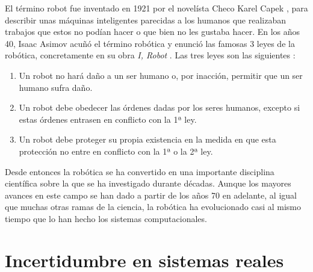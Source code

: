 El término robot fue inventado en 1921 por el novelísta Checo Karel Capek \cite{capek_r.u.r._2004}, para describir unas máquinas inteligentes parecidas a los humanos que realizaban trabajos que estos no podían hacer o que bien no les gustaba hacer. En los años 40, Isaac Asimov acuñó el término robótica y enunció las famosas 3 leyes de la robótica, concretamente en su obra \textit{I, Robot} \cite{asimov_yo_2004}. Las tres leyes son las siguientes \cite{tres_2016}: 
%
%
%
%
%
%
%

\begin{enumerate}
\item Un robot no hará daño a un ser humano o, por inacción, permitir que un ser humano sufra daño.
\item Un robot debe obedecer las órdenes dadas por los seres humanos, excepto si estas órdenes entrasen en conflicto con la 1ª ley.
\item Un robot debe proteger su propia existencia en la medida en que esta protección no entre en conflicto con la 1ª o la 2ª ley.
\end{enumerate}

Desde entonces la robótica se ha convertido en una importante disciplina científica sobre la que se ha investigado durante décadas. Aunque los mayores avances en este campo se han dado a partir de los años 70 en adelante, al igual que muchas otras ramas de la ciencia, la robótica ha evolucionado casi al mismo tiempo que lo han hecho los sistemas computacionales.
%
%
%
%
%

\section{Incertidumbre en sistemas reales}


